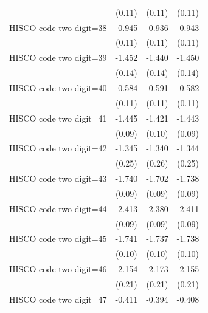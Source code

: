{\begin{tabular}{l*{3}{c}}
                    &      (0.11)         &      (0.11)         &      (0.11)         \\
HISCO code two digit=38&      -0.945\sym{***}&      -0.936\sym{***}&      -0.943\sym{***}\\
                    &      (0.11)         &      (0.11)         &      (0.11)         \\
HISCO code two digit=39&      -1.452\sym{***}&      -1.440\sym{***}&      -1.450\sym{***}\\
                    &      (0.14)         &      (0.14)         &      (0.14)         \\
HISCO code two digit=40&      -0.584\sym{***}&      -0.591\sym{***}&      -0.582\sym{***}\\
                    &      (0.11)         &      (0.11)         &      (0.11)         \\
HISCO code two digit=41&      -1.445\sym{***}&      -1.421\sym{***}&      -1.443\sym{***}\\
                    &      (0.09)         &      (0.10)         &      (0.09)         \\
HISCO code two digit=42&      -1.345\sym{***}&      -1.340\sym{***}&      -1.344\sym{***}\\
                    &      (0.25)         &      (0.26)         &      (0.25)         \\
HISCO code two digit=43&      -1.740\sym{***}&      -1.702\sym{***}&      -1.738\sym{***}\\
                    &      (0.09)         &      (0.09)         &      (0.09)         \\
HISCO code two digit=44&      -2.413\sym{***}&      -2.380\sym{***}&      -2.411\sym{***}\\
                    &      (0.09)         &      (0.09)         &      (0.09)         \\
HISCO code two digit=45&      -1.741\sym{***}&      -1.737\sym{***}&      -1.738\sym{***}\\
                    &      (0.10)         &      (0.10)         &      (0.10)         \\
HISCO code two digit=46&      -2.154\sym{***}&      -2.173\sym{***}&      -2.155\sym{***}\\
                    &      (0.21)         &      (0.21)         &      (0.21)         \\
HISCO code two digit=47&      -0.411\sym{**} &      -0.394\sym{**} &      -0.408\sym{**} \\

\end{tabular}}
